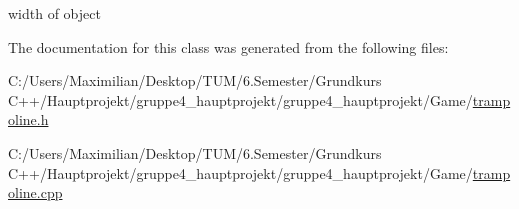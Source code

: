 width of object 



The documentation for this class was generated from the following files\+:\begin{DoxyCompactItemize}
\item 
C\+:/\+Users/\+Maximilian/\+Desktop/\+T\+U\+M/6.\+Semester/\+Grundkurs C++/\+Hauptprojekt/gruppe4\+\_\+hauptprojekt/gruppe4\+\_\+hauptprojekt/\+Game/\hyperlink{trampoline_8h}{trampoline.\+h}\item 
C\+:/\+Users/\+Maximilian/\+Desktop/\+T\+U\+M/6.\+Semester/\+Grundkurs C++/\+Hauptprojekt/gruppe4\+\_\+hauptprojekt/gruppe4\+\_\+hauptprojekt/\+Game/\hyperlink{trampoline_8cpp}{trampoline.\+cpp}\end{DoxyCompactItemize}

